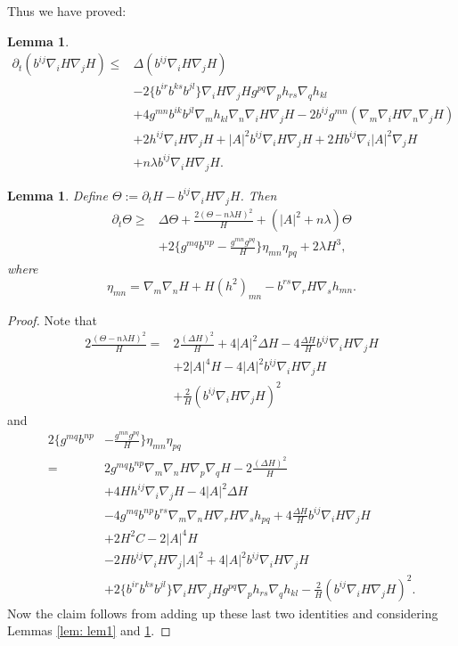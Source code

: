 \documentclass{amsart}
\newtheorem{lemma}[theorem]{Lemma}
\theoremstyle{definition}
\theoremstyle{remark}
\numberwithin{equation}{section}
\begin{document}
Thus we have proved:
\begin{lemma}\label{lem: lem2}
\begin{align*}
\partial_t(b^{ij}\nabla_iH\nabla_jH)\leq &\Delta (b^{ij}\nabla_iH\nabla_jH)\\
&-2\{b^{ir}b^{ks}b^{jl}\}\nabla_iH\nabla_jHg^{pq}\nabla_ph_{rs}\nabla_qh_{kl}\\
&+4g^{mn}b^{ik}b^{jl}\nabla_mh_{kl}\nabla_n\nabla_iH\nabla_jH-2b^{ij}g^{mn}(\nabla_m\nabla_iH\nabla_n\nabla_jH)\\
&+2h^{ij}\nabla_iH\nabla_jH+|A|^2b^{ij}\nabla_iH\nabla_jH+2Hb^{ij}\nabla_i|A|^2\nabla_jH\\
&+n\lambda b^{ij}\nabla_iH\nabla_jH.
\end{align*}
\end{lemma}
\begin{lemma}\label{lem: lema6}
Define $\Theta:=\partial_tH-b^{ij}\nabla_iH\nabla_jH$. Then
\begin{align*}
\partial_t\Theta\geq&\Delta \Theta+ \frac{2(\Theta-n\lambda H)^2}{H}+(|A|^2+n\lambda )\Theta\\
&+2\{g^{mq}b^{np}-\frac{g^{mn}g^{pq}}{H}\}\eta_{mn}\eta_{pq}+2\lambda H^3,
\end{align*}
where
\[\eta_{mn}=\nabla_m\nabla_nH+H(h^2)_{mn}-b^{rs}\nabla_rH\nabla_sh_{mn}.\]
\end{lemma}
\begin{proof}
Note that
\begin{align*}
2\frac{(\Theta-n\lambda H)^2}{H}=&2\frac{(\Delta H)^2}{H}+4|A|^2\Delta H-4\frac{\Delta H}{H}b^{ij}\nabla_iH\nabla_jH\\
&+2|A|^4H-4|A|^2b^{ij}\nabla_iH\nabla_jH\\
&+\frac{2}{H}\left(b^{ij}\nabla_iH\nabla_jH\right)^2
\end{align*}
and
\begin{align*}
2\{g^{mq}b^{np}&-\frac{g^{mn}g^{pq}}{H}\}\eta_{mn}\eta_{pq}\\
=&2g^{mq}b^{np}\nabla_m\nabla_nH\nabla_p\nabla_qH-2\frac{(\Delta H)^2}{H}\\
&+4Hh^{ij}\nabla_i\nabla_jH-4|A|^2\Delta H\\
&-4g^{mq}b^{np}b^{rs}\nabla_m\nabla_nH\nabla_rH\nabla_sh_{pq}+4\frac{\Delta H}{H}b^{ij}\nabla_iH\nabla_jH\\
&+2H^2C-2|A|^4H\\
&-2Hb^{ij}\nabla_iH\nabla_j|A|^2+4|A|^2b^{ij}\nabla_iH\nabla_jH\\
&+2\{b^{ir}b^{ks}b^{jl}\}\nabla_iH\nabla_jHg^{pq}\nabla_ph_{rs}\nabla_qh_{kl}-\frac{2}{H}\left(b^{ij}\nabla_iH\nabla_jH\right)^2.
\end{align*}
Now the claim follows from adding up these last two identities and considering Lemmas \ref{lem: lem1} and \ref{lem: lem2}.
\end{proof}
\end{document}
